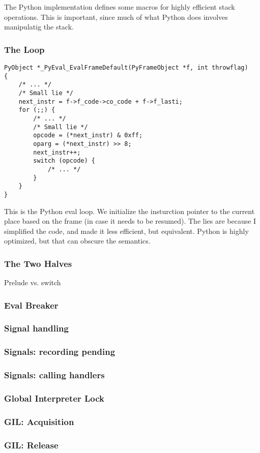 The Python implementation defines some macros for highly
efficient stack operations. This is important,
since much of what Python does involves manipulatig the
stack.

\begin{frame}[fragile]
\frametitle{The Loop}

\begin{lstlisting}
PyObject *_PyEval_EvalFrameDefault(PyFrameObject *f, int throwflag)
{
    /* ... */
    /* Small lie */
    next_instr = f->f_code->co_code + f->f_lasti;
    for (;;) {
        /* ... */
        /* Small lie */
        opcode = (*next_instr) & 0xff;
        oparg = (*next_instr) >> 8;
        next_instr++;
        switch (opcode) {
            /* ... */
        }
    }
}
\end{lstlisting}
\end{frame}

This is the Python eval loop.
We initialize the insturction pointer to the current place based
on the frame
(in case it needs to be resumed).
The lies are because I simplified the code, and made it less efficient,
but equivalent. Python is highly optimized, but that can obscure
the semantics.


\begin{frame}
\frametitle{The Two Halves}
Prelude vs. switch
\end{frame}

\begin{frame}
\frametitle{Eval Breaker}
\end{frame}

\begin{frame}
\frametitle{Signal handling}
\end{frame}

\begin{frame}
\frametitle{Signals: recording pending}
\end{frame}

\begin{frame}
\frametitle{Signals: calling handlers}
\end{frame}

\begin{frame}
\frametitle{Global Interpreter Lock}
\end{frame}

\begin{frame}
\frametitle{GIL: Acquisition}
\end{frame}

\begin{frame}
\frametitle{GIL: Release}
\end{frame}

